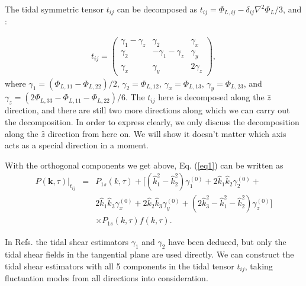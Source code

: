 \documentclass[aps,prd,twocolumn,showpacs,superscriptaddress,groupedaddress,nofootinbib]{revtex4}  %
\begin{document}
The tidal symmetric tensor $t_{ij}$ can be decomposed as $t_{ij} = \Phi_{L,ij} - \delta_{ij}\nabla^{2}\Phi_{L}/3$, and \cite{1973gw, 2012:jeong}: 

\begin{eqnarray}
t_{ij}=\left( \begin{array}{ccc}
\gamma_{1}-\gamma_{z} & \gamma_{2} & \gamma_{x}\\
\gamma_{2} & -\gamma_{1}-\gamma_{z} & \gamma_{y}\\
\gamma_{x} & \gamma_{y} & 2\gamma_z
\end{array} \right),
\label{eq5}
\end{eqnarray}
where $\gamma_{1}=(\Phi_{L,11}-\Phi_{L,22})/2$, $\gamma_{2}=\Phi_{L,12}$, $\gamma_{x}=\Phi_{L,13}$, $\gamma_{y}=\Phi_{L,23}$, and $\gamma_{z}=(2\Phi_{L,33}-\Phi_{L,11}-\Phi_{L,22})/6$.
The $t_{ij}$ here is decomposed along the $\hat{z}$ direction, and there are still two more directions along which we can carry out the decomposition. In order to express clearly, we only discuss the decomposition along the $\hat{z}$ direction from here on. We will show it doesn't matter which axis acts as a special direction in a moment.

With the orthogonal components we get above, Eq. (\ref{eq1}) can be written as
\begin{eqnarray}
P(\bm{k},\tau)|_{t_{ij}}&=&P_{1s}(k,\tau)+
[(\hat{k}_1^2-\hat{k}_2^2)\gamma_1^{(0)}+
2\hat{k}_1\hat{k}_2\gamma_2^{(0)}+\nonumber\\
&&2\hat{k}_1\hat{k}_3\gamma_x^{(0)}+
2\hat{k}_2\hat{k}_3\gamma_y^{(0)}+
(2\hat{k}_3^2-\hat{k}_1^2-\hat{k}_2^2)\gamma_z^{(0)}]
\nonumber\\&&\times P_{1s}(k,\tau)f(k,\tau).
\label{eq6}
\end{eqnarray}

In Refs. \cite{2012:pen, 2016PhRvD..93j3504Z} the tidal shear estimators $\gamma_{1}$ and $\gamma_{2}$  have been deduced, but only the tidal shear fields in the tangential plane are used directly. We can construct the tidal shear estimators with all 5 components in the tidal tensor $t_{ij}$, taking fluctuation modes from all directions into consideration.
\end{document}
